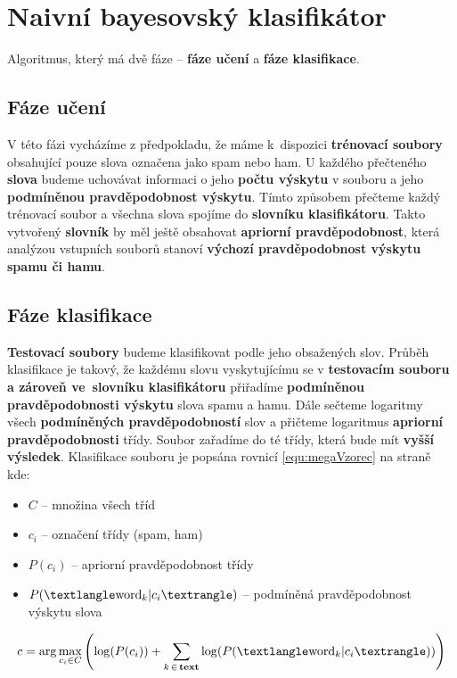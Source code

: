 \documentclass[12pt]{report}
\newcommand\la{\textlangle}  					%
\newcommand\ra{\textrangle}						%
\begin{document}
	\section{Naivní bayesovský klasifikátor}
	Algoritmus, který má dvě fáze – \textbf{fáze učení} a \textbf{fáze klasifikace}.
	
		\subsection{Fáze učení}
		V této fázi vycházíme z předpokladu, že máme k~dispozici \textbf{trénovací soubory} obsahující pouze slova označena jako spam nebo ham. U každého přečteného \textbf{slova} budeme uchovávat informaci o jeho \textbf{počtu výskytu} v souboru a jeho \textbf{podmíněnou pravděpodobnost výskytu}. Tímto způsobem přečteme každý trénovací soubor a všechna slova spojíme do \textbf{slovníku klasifikátoru}. Takto vytvořený \textbf{slovník} by měl ještě obsahovat \textbf{apriorní pravděpodobnost}, která analýzou vstupních souborů stanoví \textbf{výchozí pravděpodobnost výskytu spamu či hamu}.
	
		\subsection{Fáze klasifikace}
		\textbf{Testovací soubory} budeme klasifikovat podle jeho obsažených slov. Průběh klasifikace je takový, že každému slovu vyskytujícímu se v \textbf{testovacím souboru a zároveň ve~slovníku klasifikátoru} přiřadíme \textbf{podmíněnou pravděpodobnosti výskytu} slova spamu a hamu. Dále sečteme logaritmy všech \textbf{podmíněných pravděpodobností} slov a přičteme logaritmus \textbf{apriorní pravděpodobnosti} třídy. Soubor zařadíme do té třídy, která bude mít \textbf{vyšší výsledek}. Klasifikace souboru je popsána rovnicí \ref{equ:megaVzorec} na straně \pageref{equ:megaVzorec} kde:
		\begin{itemize}
			\item $C$ – množina všech tříd
			\item $c_i$ – označení třídy (spam, ham)
			\item $P(c_i)$ – apriorní pravděpodobnost třídy
			\item $P(\la \text{word}_k | c_i \ra)$ – podmíněná pravděpodobnost výskytu slova 
		\end{itemize}
	
		\begin{equation}
			c = \arg\max_{c_i \in C}\left( \log (P(c_i)) + \sum_{k\,\in\,\text{\bfseries text}} \log (P(\la \text{word}_k | c_i \ra))\right)
			\label{equ:megaVzorec}
		\end{equation}
			
\end{document}
